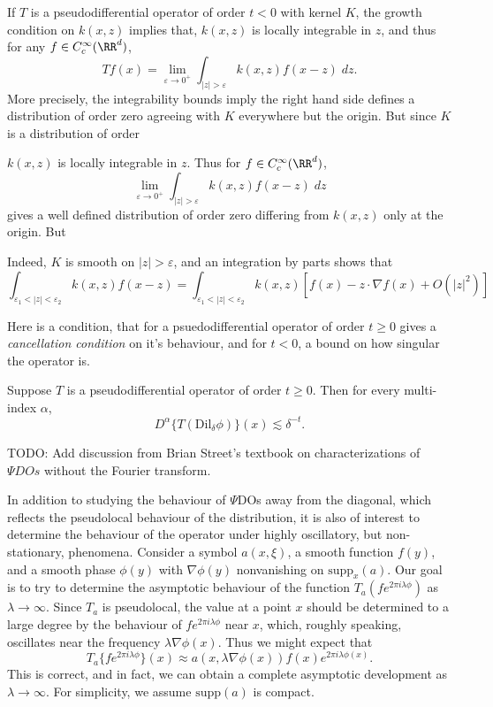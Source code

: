 If $T$ is a pseudodifferential operator of order $t < 0$ with kernel $K$, the growth condition on $k(x,z)$ implies that, $k(x,z)$ is locally integrable in $z$, and thus for any $f \in C_c^\infty(\RR^d)$,
%
\[ Tf(x) = \lim_{\varepsilon \to 0^+} \int_{|z| > \varepsilon} k(x,z) f(x-z)\; dz. \]
%
More precisely, the integrability bounds imply the right hand side defines a distribution of order zero agreeing with $K$ everywhere but the origin. But since $K$ is a distribution of order


$k(x,z)$ is locally integrable in $z$. Thus for $f \in C_c^\infty(\RR^d)$,
%
\[  \lim_{\varepsilon \to 0^+} \int_{|z| > \varepsilon} k(x,z) f(x-z)\; dz \]
%
gives a well defined distribution of order zero differing from $k(x,z)$ only at the origin. But 


Indeed, $K$ is smooth on $|z| > \varepsilon$, and an integration by parts shows that
%
\[ \int_{\varepsilon_1 < |z| < \varepsilon_2} k(x,z) f(x-z) = \int_{\varepsilon_1 < |z| < \varepsilon_2} k(x,z) [f(x) - z \cdot \nabla f(x) + O(|z|^2)] \]


Here is a condition, that for a psuedodifferential operator of order $t \geq 0$ gives a \emph{cancellation condition} on it's behaviour, and for $t < 0$, a bound on how singular the operator is.

\begin{theorem}
    Suppose $T$ is a pseudodifferential operator of order $t \geq 0$. Then for every multi-index $\alpha$,
    \[ D^\alpha \{ T (\text{Dil}_\delta \phi) \} (x) \lesssim \delta^{-t}. \]
\end{theorem}

TODO: Add discussion from Brian Street's textbook on characterizations of $\Psi DOs$ without the Fourier transform.

In addition to studying the behaviour of $\Psi$DOs away from the diagonal, which reflects the pseudolocal behaviour of the distribution, it is also of interest to determine the behaviour of the operator under highly oscillatory, but non-stationary, phenomena. Consider a symbol $a(x,\xi)$, a smooth function $f(y)$, and a smooth phase $\phi(y)$ with $\nabla \phi(y)$ nonvanishing on $\text{supp}_x(a)$. Our goal is to try to determine the asymptotic behaviour of the function $T_a(f e^{2 \pi i \lambda \phi})$ as $\lambda \to \infty$. Since $T_a$ is pseudolocal, the value at a point $x$ should be determined to a large degree by the behaviour of $f e^{2 \pi i \lambda \phi}$ near $x$, which, roughly speaking, oscillates near the frequency $\lambda \nabla \phi(x)$. Thus we might expect that
%
\[ T_a \{ f e^{2 \pi i \lambda \phi} \} (x) \approx a(x,\lambda \nabla \phi(x)) f(x) e^{2 \pi i \lambda \phi(x)}. \]
%
This is correct, and in fact, we can obtain a complete asymptotic development as $\lambda \to \infty$. For simplicity, we assume $\text{supp}(a)$ is compact.

